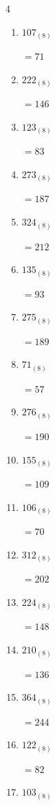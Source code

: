 \begin{multicols}{4}
\begin{enumerate}
  \item $107_{(8)}$

        $=71$

  \item $222_{(8)}$

        $=146$

\columnbreak %

  \item $123_{(8)}$

        $=83$

  \item $273_{(8)}$

        $=187$

  \item $324_{(8)}$

        $=212$

  \item $135_{(8)}$

        $=93$

  \item $275_{(8)}$

        $=189$

  \item $71_{(8)}$

        $=57$

  \item $276_{(8)}$

        $=190$

  \item $155_{(8)}$

        $=109$

  \item $106_{(8)}$

        $=70$

  \item $312_{(8)}$

        $=202$

  \item $224_{(8)}$

        $=148$

  \item $210_{(8)}$

        $=136$

  \item $364_{(8)}$

        $=244$

  \item $122_{(8)}$

        $=82$

  \item $103_{(8)}$


\end{enumerate}
\end{multicols}
